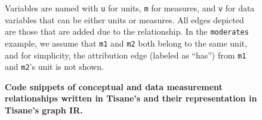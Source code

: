 {\begin{figure}
\begin{tikzpicture}
        \end{tikzpicture}
        \caption{\textbf{Code snippets of conceptual and data measurement relationships written in Tisane's \SDSLlong and their representation in Tisane's graph IR.}}
            \begin{small}
            \begin{minipage}{\linewidth}
                Variables are named with \texttt{u} for units, \texttt{m} for measures, and \texttt{v} for data variables that can be either units or measures. All edges depicted are those that are added due to the relationship. In the \texttt{moderates} example, we assume that \texttt{m1} and \texttt{m2} both belong to the same unit, and for simplicity, the attribution edge (labeled as ``has'') from \texttt{m1} and \texttt{m2}'s unit is not shown.
            \end{minipage}
            \end{small}
        \label{fig:figureSDSLToGraphIR}
    \end{figure}
}


